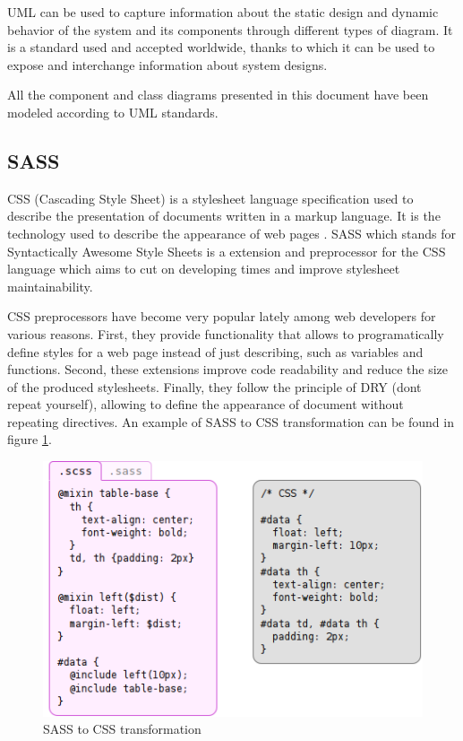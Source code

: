 UML can be used to capture information about the static design and dynamic behavior of the system and its components through different types of diagram. It is a standard used and accepted worldwide, thanks to which it can be used to expose and interchange information about system designs.

All the component and class diagrams presented in this document have been modeled according to UML standards.

\subsection{SASS}

CSS (Cascading Style Sheet) is a stylesheet language specification used to describe the presentation of documents written in a markup language. It is the technology used to describe the appearance of web pages \cite{css}. SASS \cite{sass} which stands for Syntactically Awesome Style Sheets is a extension and preprocessor for the CSS language which aims to cut on developing times and improve stylesheet maintainability. 

CSS preprocessors have become very popular lately among web developers for various reasons. First, they provide functionality that allows to programatically define styles for a web page instead of just describing, such as variables and functions. Second, these extensions improve code readability and reduce the size of the produced stylesheets. Finally, they follow the principle of DRY (dont repeat yourself), allowing to define the appearance of document without repeating directives. An example of SASS to CSS transformation can be found in figure \ref{fig:sass}.

\begin{figure}[ht]
  \centering
  \includegraphics[width=.8\textwidth]{fig/sass}
  \caption{SASS to CSS transformation}
  \label{fig:sass}
\end{figure} 

